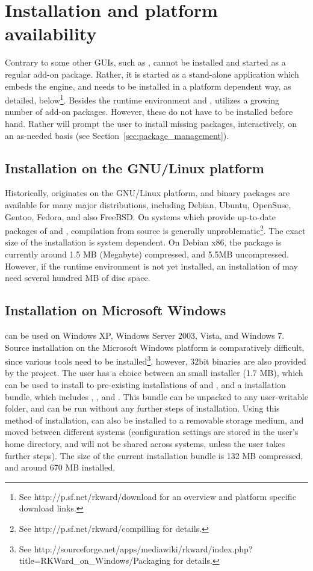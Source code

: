 \section{Installation and platform availability}
\label{sec:installing_starting_RKWard}
Contrary to some other  GUIs, such as ,  cannot be installed and started as a
regular  add-on package. Rather, it is started as a stand-alone application which embeds the
 engine, and needs to be installed in a platform dependent way, as detailed, below\footnote{
  See http://p.sf.net/rkward/download for an overview and platform specific download links.
}. Besides the
 runtime environment and ,  utilizes a growing number of  add-on packages.
However, these do not have to be installed before hand. Rather  will prompt the user to install
missing packages, interactively, on an as-needed basis (see Section~\ref{sec:package_management}).

\subsection{Installation on the GNU/Linux platform}
Historically,  originates on the GNU/Linux platform, and binary packages are available for many major
distributions, including Debian, Ubuntu, OpenSuse, Gentoo, Fedora, and also FreeBSD. On systems which
provide up-to-date packages of  and , compilation from source is generally unproblematic\footnote{
  See http://p.sf.net/rkward/compilling for details.
}. The exact size of the installation is system dependent. On Debian x86, the package is currently around 1.5 MB (Megabyte) compressed,
and 5.5MB uncompressed. However, if the  runtime environment is not yet installed, an installation of  may
need several hundred MB of disc space.

\subsection{Installation on Microsoft Windows}
 can be used on Windows XP, Windows Server 2003, Vista, and Windows 7. Source installation on the
Microsoft Windows platform is comparatively difficult, since various tools need to be installed\footnote{
  See http://sourceforge.net/apps/mediawiki/rkward/index.php?title=RKWard_on_Windows/Packaging for details.
}, however, 32bit binaries are also provided by the project. The user has a choice between an small installer (1.7 MB),
which can be used to install  to pre-existing installations of  and , and a installation
bundle, which includes , , and . This bundle can be unpacked to any user-writable folder,
and can be run without any further steps of installation. Using this method of installation,
 can also be installed to a removable storage medium, and moved between different systems (configuration
settings are stored in the user's home directory, and will not be shared across systems, unless the user takes further steps).
The size of the current installation bundle is 132 MB compressed, and around 670 MB installed.

